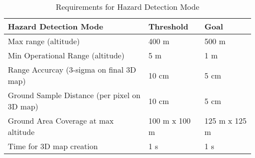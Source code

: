 \begin{table}[H]
\centering
\caption{Requirements for Hazard Detection Mode}
\label{tab:req_hazard_detection}
\begin{tabular}{|l|ll|} \hline
\textbf{Hazard Detection Mode}               & Threshold     & Goal          \\ \hline
Max range (altitude)                         & 400 m         & 500 m         \\
Min Operational Range (altitude)             & 5 m           & 1 m           \\
Range Accurcay (3-sigma on final 3D map)     & 10 cm         & 5 cm          \\
Ground Sample Distance (per pixel on 3D map) & 10 cm         & 5 cm          \\
Ground Area Coverage at max altitude         & 100 m x 100 m & 125 m x 125 m \\
Time for 3D map creation                     & 1 s           & 1 s           \\ \hline
\end{tabular}
\end{table}
